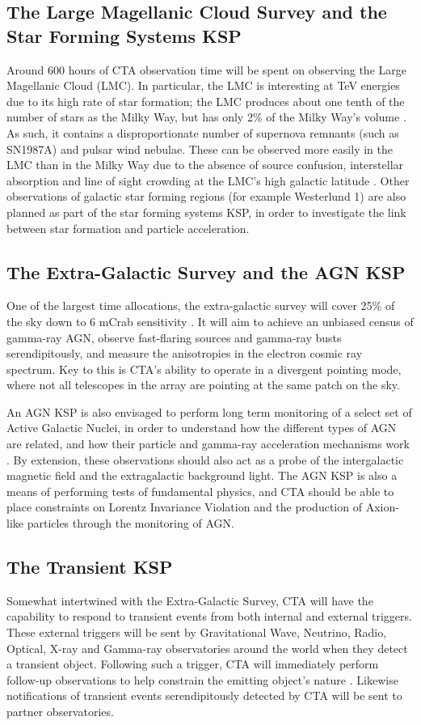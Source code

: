 \subsection{The Large Magellanic Cloud Survey and the Star Forming Systems KSP} Around 600 hours of CTA observation time will be spent on observing the Large Magellanic Cloud (LMC). In particular, the LMC is interesting at TeV energies due to its high rate of star formation; the LMC produces about one tenth of the number of stars as the Milky Way, but has only 2\% of the Milky Way's volume \cite{scienceCTA}.
As such, it contains a disproportionate number of supernova remnants (such as SN1987A) and pulsar wind nebulae.  These can be observed more easily in the LMC than in the Milky Way due to the absence of source confusion, interstellar absorption and line of sight crowding at the LMC's high galactic latitude \cite{scienceCTA}. Other observations of galactic star forming regions (for example Westerlund 1) are also planned as part of the star forming systems KSP, in order to investigate the link between star formation and particle acceleration.

\subsection{The Extra-Galactic Survey and the AGN KSP} One of the largest time allocations, the extra-galactic survey will cover 25\% of the sky down to 6 mCrab sensitivity \cite{scienceCTA}. It will aim to achieve an unbiased census of gamma-ray AGN, observe fast-flaring sources and gamma-ray busts serendipitously, and measure the anisotropies in the electron cosmic ray spectrum. Key to this is CTA's ability to operate in a divergent pointing mode, where not all telescopes in the array are pointing at the same patch on the sky. 

An AGN KSP is also envisaged to perform long term monitoring of a select set of Active Galactic Nuclei, in order to understand how the different types of AGN are related, and how their particle and gamma-ray acceleration mechanisms work \cite{scienceCTA}. By extension, these observations should also act as a probe of the intergalactic magnetic field and the extragalactic background light. The AGN KSP is also a means of performing tests of fundamental physics, and CTA should be able to place constraints on Lorentz Invariance Violation and the production of Axion-like particles through the monitoring of AGN. 

\subsection{The Transient KSP} Somewhat intertwined with the Extra-Galactic Survey, CTA will have the capability to respond to transient events from both internal and external triggers. These external triggers will be sent by Gravitational Wave, Neutrino, Radio, Optical, X-ray and Gamma-ray observatories around the world when they detect a transient object. Following such a trigger, CTA will immediately perform follow-up observations to help constrain the emitting object's nature \cite{scienceCTA}. Likewise notifications of transient events serendipitously detected by CTA will be sent to partner observatories.

